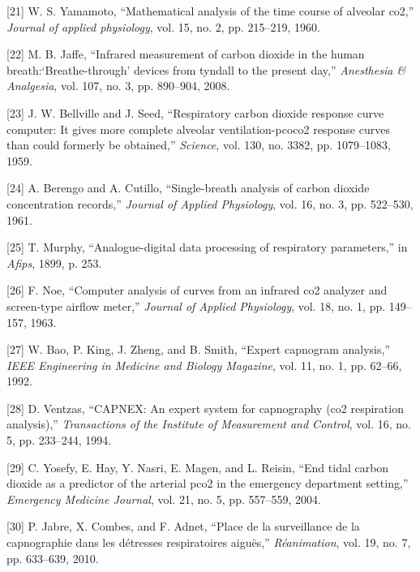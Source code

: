 \documentclass[12pt,]{article}
\begin{document}
\leavevmode\hypertarget{ref-yamamoto1960mathematical}{}%
{[}21{]} W. S. Yamamoto, ``Mathematical analysis of the time course of
alveolar co2,'' \emph{Journal of applied physiology}, vol. 15, no. 2,
pp. 215--219, 1960.

\leavevmode\hypertarget{ref-jaffe2008infrared}{}%
{[}22{]} M. B. Jaffe, ``Infrared measurement of carbon dioxide in the
human breath:`Breathe-through' devices from tyndall to the present
day,'' \emph{Anesthesia \& Analgesia}, vol. 107, no. 3, pp. 890--904,
2008.

\leavevmode\hypertarget{ref-bellville1959respiratory}{}%
{[}23{]} J. W. Bellville and J. Seed, ``Respiratory carbon dioxide
response curve computer: It gives more complete alveolar
ventilation-pcoco2 response curves than could formerly be obtained,''
\emph{Science}, vol. 130, no. 3382, pp. 1079--1083, 1959.

\leavevmode\hypertarget{ref-berengo1961single}{}%
{[}24{]} A. Berengo and A. Cutillo, ``Single-breath analysis of carbon
dioxide concentration records,'' \emph{Journal of Applied Physiology},
vol. 16, no. 3, pp. 522--530, 1961.

\leavevmode\hypertarget{ref-murphy1899analogue}{}%
{[}25{]} T. Murphy, ``Analogue-digital data processing of respiratory
parameters,'' in \emph{Afips}, 1899, p. 253.

\leavevmode\hypertarget{ref-noe1963computer}{}%
{[}26{]} F. Noe, ``Computer analysis of curves from an infrared co2
analyzer and screen-type airflow meter,'' \emph{Journal of Applied
Physiology}, vol. 18, no. 1, pp. 149--157, 1963.

\leavevmode\hypertarget{ref-bao1992expert}{}%
{[}27{]} W. Bao, P. King, J. Zheng, and B. Smith, ``Expert capnogram
analysis,'' \emph{IEEE Engineering in Medicine and Biology Magazine},
vol. 11, no. 1, pp. 62--66, 1992.

\leavevmode\hypertarget{ref-ventzas1994capnex}{}%
{[}28{]} D. Ventzas, ``CAPNEX: An expert system for capnography (co2
respiration analysis),'' \emph{Transactions of the Institute of
Measurement and Control}, vol. 16, no. 5, pp. 233--244, 1994.

\leavevmode\hypertarget{ref-yosefy2004end}{}%
{[}29{]} C. Yosefy, E. Hay, Y. Nasri, E. Magen, and L. Reisin, ``End
tidal carbon dioxide as a predictor of the arterial pco2 in the
emergency department setting,'' \emph{Emergency Medicine Journal}, vol.
21, no. 5, pp. 557--559, 2004.

\leavevmode\hypertarget{ref-jabre2010place}{}%
{[}30{]} P. Jabre, X. Combes, and F. Adnet, ``Place de la surveillance
de la capnographie dans les détresses respiratoires aiguës,''
\emph{Réanimation}, vol. 19, no. 7, pp. 633--639, 2010.
\end{document}
